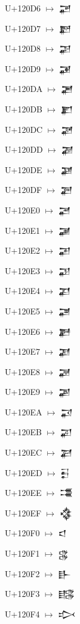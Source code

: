 {\noindent U+120D6  $\mapsto$ {\cufont 𒃖}\par
\noindent U+120D7  $\mapsto$ {\cufont 𒃗}\par
\noindent U+120D8  $\mapsto$ {\cufont 𒃘}\par
\noindent U+120D9  $\mapsto$ {\cufont 𒃙}\par
\noindent U+120DA  $\mapsto$ {\cufont 𒃚}\par
\noindent U+120DB  $\mapsto$ {\cufont 𒃛}\par
\noindent U+120DC  $\mapsto$ {\cufont 𒃜}\par
\noindent U+120DD  $\mapsto$ {\cufont 𒃝}\par
\noindent U+120DE  $\mapsto$ {\cufont 𒃞}\par
\noindent U+120DF  $\mapsto$ {\cufont 𒃟}\par
\noindent U+120E0  $\mapsto$ {\cufont 𒃠}\par
\noindent U+120E1  $\mapsto$ {\cufont 𒃡}\par
\noindent U+120E2  $\mapsto$ {\cufont 𒃢}\par
\noindent U+120E3  $\mapsto$ {\cufont 𒃣}\par
\noindent U+120E4  $\mapsto$ {\cufont 𒃤}\par
\noindent U+120E5  $\mapsto$ {\cufont 𒃥}\par
\noindent U+120E6  $\mapsto$ {\cufont 𒃦}\par
\noindent U+120E7  $\mapsto$ {\cufont 𒃧}\par
\noindent U+120E8  $\mapsto$ {\cufont 𒃨}\par
\noindent U+120E9  $\mapsto$ {\cufont 𒃩}\par
\noindent U+120EA  $\mapsto$ {\cufont 𒃪}\par
\noindent U+120EB  $\mapsto$ {\cufont 𒃫}\par
\noindent U+120EC  $\mapsto$ {\cufont 𒃬}\par
\noindent U+120ED  $\mapsto$ {\cufont 𒃭}\par
\noindent U+120EE  $\mapsto$ {\cufont 𒃮}\par
\noindent U+120EF  $\mapsto$ {\cufont 𒃯}\par
\noindent U+120F0  $\mapsto$ {\cufont 𒃰}\par
\noindent U+120F1  $\mapsto$ {\cufont 𒃱}\par
\noindent U+120F2  $\mapsto$ {\cufont 𒃲}\par
\noindent U+120F3  $\mapsto$ {\cufont 𒃳}\par
\noindent U+120F4  $\mapsto$ {\cufont 𒃴}\par
}
